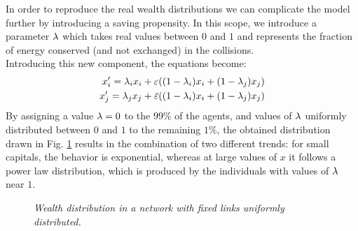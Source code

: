 In order to reproduce the real wealth distributions we can complicate the model further by introducing a saving propensity.
In this scope, we introduce a parameter $\lambda$ which takes real values between $0$ and $1$ and represents the fraction of energy conserved (and not exchanged) in the collisions. \\
Introducing this new component, the equations become:
\begin{equation}
	\begin{split}
		x'_i = \lambda_ix_i + \varepsilon((1-\lambda_i)x_i + (1-\lambda_j)x_j) 	\\
		x'_j = \lambda_jx_j + \bar{\varepsilon}((1-\lambda_i)x_i + (1-\lambda_j)x_j) 	\\
	\end{split}
\end{equation}
By assigning a value $\lambda = 0$ to the $99 \%$ of the agents, and values of $\lambda$ uniformly distributed between $0$ and $1$ to the remaining $1\%$, the obtained distribution drawn in Fig. \ref{fig:savings} results in the combination of two different trends: for small capitals, the behavior is exponential, whereas at large values of $x$ it follows a power law distribution, which is produced by the individuals with values of $\lambda$ near $1$.
\begin{figure}[ht!]
    \centering
    \scalebox{.7}{}
    \caption{\emph{Wealth distribution in a network with fixed links uniformly distributed.}}
    \label{fig:savings}
\end{figure}
